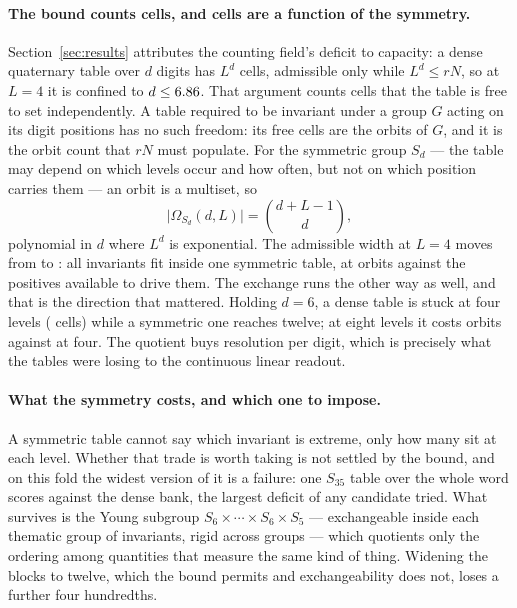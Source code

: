 \documentclass[11pt]{article}
\begin{document}
\paragraph{The bound counts cells, and cells are a function of the symmetry.}
Section~\ref{sec:results} attributes the counting field's deficit to capacity: a
dense quaternary table over \(d\) digits has \(L^{d}\) cells, admissible only
while \(L^{d} \le rN\), so at \(L=4\) it is confined to \(d \le
6.86{}\). That argument counts cells that the table is free to set
independently. A table required to be invariant under a group \(G\) acting on
its digit positions has no such freedom: its free cells are the orbits of \(G\),
and it is the orbit count that \(rN\) must populate. For the symmetric group
\(S_d\) --- the table may depend on which levels occur and how often, but not on
which position carries them --- an orbit is a multiset, so
\begin{equation}
  \bigl|\Omega_{S_d}(d, L)\bigr| = \binom{d + L - 1}{d},
\end{equation}
polynomial in \(d\) where \(L^{d}\) is exponential. The admissible width at
\(L=4\) moves from \QuoDenseWidth{} to \QuoSymWidth{}: all \NAlgFeatures{}
invariants fit inside one symmetric table, at \QuoSymCellsAll{} orbits against
the \NTrainPositives{} positives available to drive them. The exchange runs the
other way as well, and that is the direction that mattered. Holding \(d = 6\), a
dense table is stuck at four levels (\QuoDenseCells{} cells) while a symmetric
one reaches twelve; at eight levels it costs \QuoSymCellsEight{} orbits against
\QuoSymCells{} at four. The quotient buys resolution per digit, which is
precisely what the tables were losing to the continuous linear readout.

\paragraph{What the symmetry costs, and which one to impose.} A symmetric table
cannot say which invariant is extreme, only how many sit at each level. Whether
that trade is worth taking is not settled by the bound, and on this fold the
widest version of it is a failure: one \(S_{35}\) table over the whole word
scores \QuoWorstArchDelta{} against the dense bank, the largest deficit of any
candidate tried. What survives is the Young subgroup \(S_6 \times \cdots \times
S_6 \times S_5\) --- exchangeable inside each thematic group of invariants,
rigid across groups --- which quotients only the ordering among quantities that
measure the same kind of thing. Widening the blocks to twelve, which the bound
permits and exchangeability does not, loses a further four hundredths.
\end{document}
